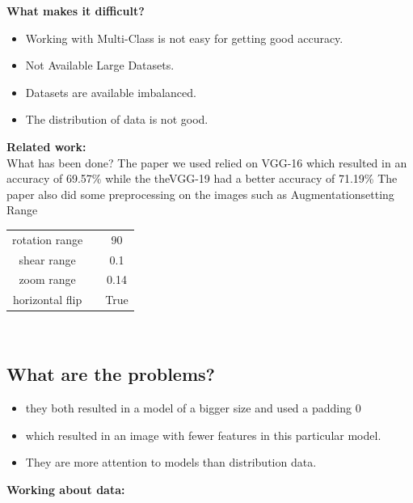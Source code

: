 \documentclass{article}
\begin{document}
	\textbf{What makes it difficult?}
	\begin{itemize}
		\item Working with Multi-Class is not easy for getting good accuracy.
		\item Not Available Large Datasets.
		\item Datasets are available imbalanced.
		\item The distribution of data is not good.
	\end{itemize}
	\textbf{Related work:}\\
	What has been done? 
	The paper we used relied on VGG-16 which resulted in an accuracy of 69.57\% while the theVGG-19 had a better accuracy of 71.19\%
	The paper also did some preprocessing on the images such as
	Augmentationsetting Range \\
	\begin{center}
		\begin{tabular}{ccc}
			rotation range       &&        90 \\
			shear range            &&      0.1\\
			zoom range               &&   0.14 \\
			horizontal flip            &&    True\\
		\end{tabular}\\
	\end{center}
	\subsection *{What are the problems?}
		
	\begin{itemize}
		\item they both resulted in a model of a bigger size and used a padding 0
		\item which resulted in an image with fewer features in this particular
		model. 
		\item They are more attention to models than distribution data.
		
	\end{itemize}
	 \textbf{Working about data:}
		 
\end{document}
